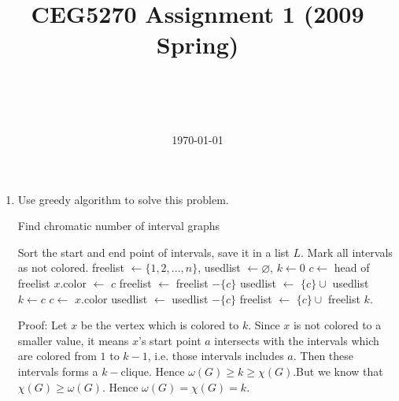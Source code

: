 \documentclass[a4paper,12pt]{article}
\title{CEG5270 Assignment 1 (2009 Spring)}
\author{\myname\\\mymail\\\CSE\\\CUHK}
\date{\today}
\begin{document}
\maketitle
\begin{enumerate}
\item
Use greedy algorithm to solve this problem.\\
\begin{algorithm}[htbp!]
\caption{Find chromatic number of interval graphs}
\begin{algorithmic}[1]
\STATE Sort the start and end point of intervals, save it in a list $L$.
\STATE Mark all intervals as not colored.
\STATE freelist $\leftarrow \{1,2,...,n\}$, usedlist $\leftarrow \varnothing$, $k \leftarrow 0$
        \STATE $c \leftarrow $ head of freelist
        \STATE $x$.color $\leftarrow$ $c$
        \STATE freelist $\leftarrow$ freelist $- \{c\}$
        \STATE usedlist $\leftarrow$ $\{c\} \cup$ usedlist
            \STATE $k \leftarrow c$
        \ENDIF
        \STATE $c \leftarrow $ $x$.color
        \STATE usedlist $\leftarrow$ usedlist $- \{c\}$
        \STATE freelist $\leftarrow$ $\{c\} \cup$ freelist
    \ENDIF
\ENDFOR
\RETURN  $k$.
\end{algorithmic}
\end{algorithm}


Proof: Let $x$ be the vertex which is colored to $k$. Since $x$ is not colored to a smaller value,
it means $x$'s start point $a$ intersects with the intervals which are colored from $1$ to $k-1$,
i.e. those intervals includes $a$. Then these intervals forms a $k-$clique.
Hence $\omega(G) \geq k \geq \chi(G)$.But we know that $\chi(G) \geq \omega(G)$.
Hence $\omega(G) = \chi(G) = k$.


\end{enumerate}
\end{document}

